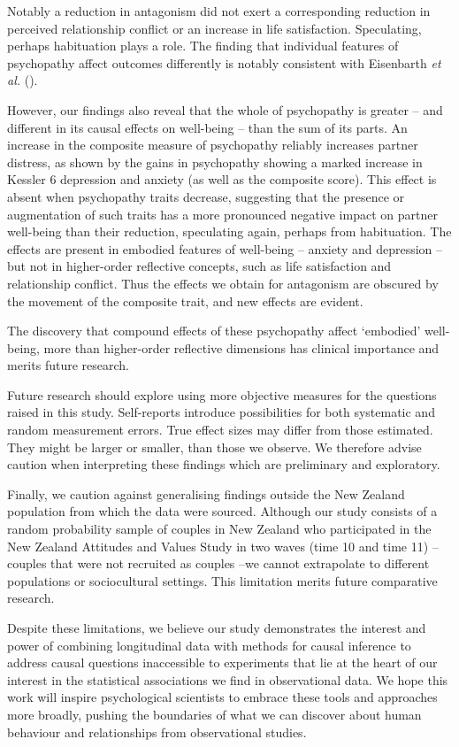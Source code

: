 \documentclass[
  singlecolumn]{article}
\begin{document}
Notably a reduction in antagonism did not exert a corresponding
reduction in perceived relationship conflict or an increase in life
satisfaction. Speculating, perhaps habituation plays a role. The finding
that individual features of psychopathy affect outcomes differently is
notably consistent with Eisenbarth \emph{et al.}
().

However, our findings also reveal that the whole of psychopathy is
greater -- and different in its causal effects on well-being -- than the
sum of its parts. An increase in the composite measure of psychopathy
reliably increases partner distress, as shown by the gains in
psychopathy showing a marked increase in Kessler 6 depression and
anxiety (as well as the composite score). This effect is absent when
psychopathy traits decrease, suggesting that the presence or
augmentation of such traits has a more pronounced negative impact on
partner well-being than their reduction, speculating again, perhaps from
habituation. The effects are present in embodied features of well-being
-- anxiety and depression -- but not in higher-order reflective
concepts, such as life satisfaction and relationship conflict. Thus the
effects we obtain for antagonism are obscured by the movement of the
composite trait, and new effects are evident.

The discovery that compound effects of these psychopathy affect
`embodied' well-being, more than higher-order reflective dimensions has
clinical importance and merits future research.

Future research should explore using more objective measures for the
questions raised in this study. Self-reports introduce possibilities for
both systematic and random measurement errors. True effect sizes may
differ from those estimated. They might be larger or smaller, than those
we observe. We therefore advise caution when interpreting these findings
which are preliminary and exploratory.

Finally, we caution against generalising findings outside the New
Zealand population from which the data were sourced. Although our study
consists of a random probability sample of couples in New Zealand who
participated in the New Zealand Attitudes and Values Study in two waves
(time 10 and time 11) -- couples that were not recruited as couples --we
cannot extrapolate to different populations or sociocultural settings.
This limitation merits future comparative research.

Despite these limitations, we believe our study demonstrates the
interest and power of combining longitudinal data with methods for
causal inference to address causal questions inaccessible to experiments
that lie at the heart of our interest in the statistical associations we
find in observational data. We hope this work will inspire psychological
scientists to embrace these tools and approaches more broadly, pushing
the boundaries of what we can discover about human behaviour and
relationships from observational studies.
\end{document}

